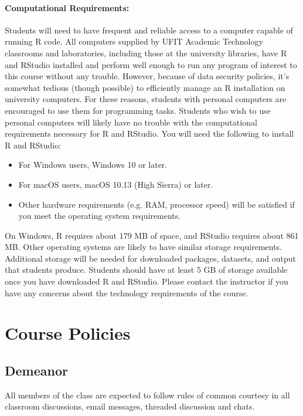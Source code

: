 \documentclass[11pt]{article}
\begin{document}
\paragraph{Computational Requirements:} 
Students will need to have frequent and reliable access to a computer capable of running R code. All computers supplied by UFIT Academic Technology classrooms and laboratories, including those at the university libraries, have R and RStudio installed and perform well enough to run any program of interest to this course without any trouble. However, because of data security policies, it’s somewhat tedious (though possible) to efficiently manage an R installation on university computers. For these reasons, students with personal computers are encouraged to use them for programming tasks. Students who wish to use personal computers will likely have no trouble with the computational requirements necessary for R and RStudio. You will need the following to install R and RStudio:
\begin{itemize}
	\item For Windows users, Windows 10 or later.
	\item For macOS users, macOS 10.13 (High Sierra) or later.
	\item Other hardware requirements (e.g. RAM, processor speed) will be satisfied if you meet the operating system requirements.
\end{itemize}
On Windows, R requires about 179 MB of space, and RStudio requires about 861 MB. Other operating systems are likely to have similar storage requirements. Additional storage will be needed for downloaded packages, datasets, and output that students produce. Students should have at least 5 GB of storage available once you have downloaded R and RStudio. Please contact the instructor if you have any concerns about the technology requirements of the course.

	
\section*{Course Policies}

\subsection*{Demeanor}
All members of the class are expected to follow rules of common courtesy in all classroom discussions, email messages, threaded discussion and chats.  
\end{document}
